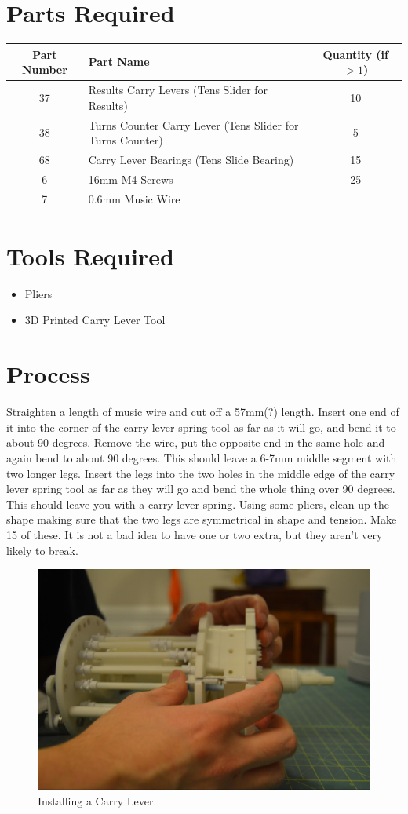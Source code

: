 \documentclass[openany]{book}
\begin{document}
\section{Parts Required}
\begin{table}[!ht]
	\centering
	\begin{tabular}{clc}
		Part Number & Part Name & Quantity (if $>1$) \\ \hline
		37 & Results Carry Levers (Tens Slider for Results) & 10 \\
		38 & Turns Counter Carry Lever (Tens Slider for Turns Counter) & 5 \\
		68 & Carry Lever Bearings (Tens Slide Bearing) & 15 \\ \hline \hline
		6 & 16mm M4 Screws & 25 \\
		7 & 0.6mm Music Wire & 
	\end{tabular}
\end{table}

\section{Tools Required}
\begin{itemize}
	\item Pliers
	\item 3D Printed Carry Lever Tool
\end{itemize}


\section{Process}
Straighten a length of music wire and cut off a 57mm(?) length. Insert one end of it into the corner of the carry lever spring tool as far as it will go, and bend it to about 90 degrees. Remove the wire, put the opposite end in the same hole and again bend to about 90 degrees. This should leave a 6-7mm middle segment with two longer legs. Insert the legs into the two holes in the middle edge of the carry lever spring tool as far as they will go and bend the whole thing over 90 degrees. This should leave you with a carry lever spring. Using some pliers, clean up the shape making sure that the two legs are symmetrical in shape and tension. Make 15 of these. It is not a bad idea to have one or two extra, but they aren’t very likely to break.

\begin{figure}[!ht]
	\centering
	\includegraphics[width=.75\textwidth]{images/image44.jpg}
	\caption{Installing a Carry Lever.}
	\label{fig:image44}	
\end{figure}
\end{document}
